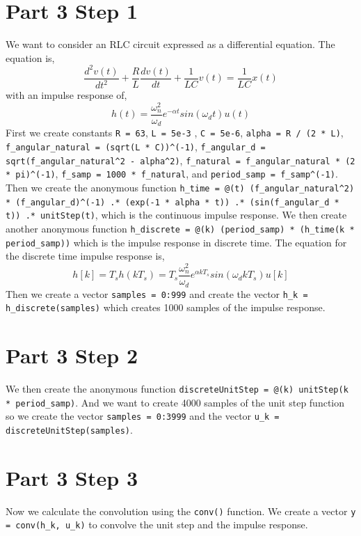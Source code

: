 \documentclass[a4paper, 10pt]{article}
\begin{document}
\section*{Part 3 Step 1}
We want to consider an RLC circuit expressed as a differential equation. The equation is,
\begin{equation}
	\frac{d^2v(t)}{dt^2} + \frac{R}{L}\frac{dv(t)}{dt} + \frac{1}{LC}v(t) = \frac{1}{LC}x(t)
\end{equation}
with an impulse response of,
\begin{equation}
	h(t) = \frac{\omega^2_n}{\omega_d}e^{-\alpha t}sin(\omega_d t)u(t)
\end{equation}
First we create constants \texttt{R = 63}, \texttt{L = 5e-3} , \texttt{C = 5e-6}, \texttt{alpha = R / (2 * L)}, \texttt{f\_angular\_natural = (sqrt(L * C))\^{}(-1)}, \texttt{f\_angular\_d = sqrt(f\_angular\_natural\^{}2 - alpha\^{}2)}, \texttt{f\_natural = f\_angular\_natural * (2 * pi)\^{}(-1)}, \texttt{f\_samp = 1000 * f\_natural}, and \texttt{period\_samp = f\_samp\^{}(-1)}. Then we create the anonymous function \texttt{h\_time = @(t) (f\_angular\_natural\^{}2) * (f\_angular\_d)\^{}(-1) .* (exp(-1 * alpha * t)) .* (sin(f\_angular\_d * t)) .* unitStep(t)}, which is the continuous impulse response. We then create another anonymous function \texttt{h\_discrete = @(k) (period\_samp) * (h\_time(k * period\_samp))} which is the impulse response in discrete time. The equation for the discrete time impulse response is,
\begin{equation}
	h[k] = T_sh(kT_s) = T_s \frac{\omega^2_n}{\omega_d}e^{\alpha k T_{s}}sin(\omega_d k T_s)u[k]
\end{equation}
Then we create a vector \texttt{samples = 0:999} and create the vector \texttt{h\_k = h\_discrete(samples)} which creates 1000 samples of the impulse response.

\section*{Part 3 Step 2}
We then create the anonymous function \texttt{discreteUnitStep = @(k) unitStep(k * period\_samp)}. And we want to create 4000 samples of the unit step function so we create the vector \texttt{samples = 0:3999} and the vector \texttt{u\_k = discreteUnitStep(samples)}.

\section*{Part 3 Step 3}
Now we calculate the convolution using the \texttt{conv()} function. We create a vector \texttt{y = conv(h\_k, u\_k)} to convolve the unit step and the impulse response.
\end{document}
